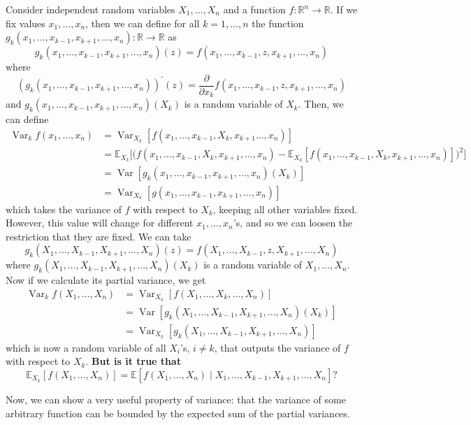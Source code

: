 \documentclass{article}
\DeclareMathOperator{\Var}{Var}
\begin{document}
  Consider independent random variables $X_1, \ldots, X_n$ and a function $f: \mathbb{R}^n \longrightarrow \mathbb{R}$. If we fix values $x_1, \ldots, x_n$, then we can define for all $k = 1, \ldots, n$ the function $g_{k}(x_1, \ldots, x_{k-1}, x_{k+1}, \ldots, x_n): \mathbb{R} \rightarrow \mathbb{R}$ as 
  \[g_{k}(x_1, \ldots, x_{k-1}, x_{k+1}, \ldots, x_n)(z) = f(x_1, \ldots, x_{k-1}, z, x_{k+1}, \ldots, x_n)\]
  where 
  \[(g_{k}(x_1, \ldots, x_{k-1}, x_{k+1}, \ldots, x_n))^\prime (z) = \frac{\partial}{\partial x_k} f(x_1, \ldots, x_{k-1}, z, x_{k+1}, \ldots, x_n)\]
  and $g_k (x_1, \ldots, x_{k-1}, x_{k+1}, \ldots, x_n) (X_k)$ is a random variable of $X_k$. Then, we can define 
  \begin{align*}
      \Var_k f(x_1, \ldots, x_n) & = \Var_{X_k} [ f(x_1, \ldots, x_{k-1}, X_k, x_{k+1} \ldots, x_n)] \\ 
      & = \mathbb{E}_{X_k} \big[ \big( f (x_1, \ldots, x_{k-1}, X_k, x_{k+1}, \ldots, x_n) - \mathbb{E}_{X_k} [f (x_1, \ldots, x_{k-1}, X_k, x_{k+1}, \ldots, x_n)] \big)^2 \big] \\
      & = \Var[g_{k} (x_1, \ldots, x_{k-1}, x_{k+1}, \ldots, x_n) (X_k)] \\
      & = \Var_{X_k} [g(x_1, \ldots, x_{k-1}, x_{k+1}, \ldots, x_n)] 
  \end{align*}
  which takes the variance of $f$ with respect to $X_k$, keeping all other variables fixed. However, this value will change for different $x_1, \ldots, x_n$'s, and so we can loosen the restriction that they are fixed. We can take 
  \[g_k (X_1, \ldots, X_{k-1}, X_{k+1}, \ldots, X_n) (z) = f(X_1, \ldots, X_{k-1}, z, X_{k+1}, \ldots, X_n)\]
  where $g_k (X_1, \ldots, X_{k-1}, X_{k+1}, \ldots, X_n) (X_k)$ is a random variable of $X_1, \ldots, X_n$. Now if we calculate its partial variance, we get 
  \begin{align*}
      \Var_k f(X_1, \ldots, X_n) & = \Var_{X_k} [f(X_1, \ldots, X_k, \ldots, X_n)]\\
      & = \Var [g_k (X_1, \ldots, X_{k-1}, X_{k+1}, \ldots, X_n) (X_k)] \\
      & = \Var_{X_k} [g_k (X_1, \ldots, X_{k-1}, X_{k+1}, \ldots, X_n)]
  \end{align*}
  which is now a random variable of all $X_i$'s, $i \neq k$, that outputs the variance of $f$ with respect to $X_k$. \textbf{But is it true that }
  \[\mathbb{E}_{X_k} [ f(X_1, \ldots, X_n)] = \mathbb{E}[ f(X_1, \ldots, X_n) \mid X_1, \ldots, X_{k-1}, X_{k+1}, \ldots, X_n] ?\]


  Now, we can show a very useful property of variance: that the variance of some arbitrary function can be bounded by the expected sum of the partial variances. 
\end{document}
